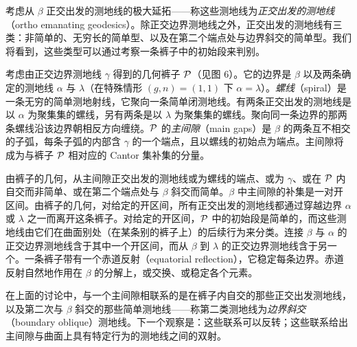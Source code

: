 
考虑从 $\beta$ 正交出发的测地线的极大延拓——称这些测地线为\emph{正交出发的测地线}（ortho emanating geodesics）。除正交边界测地线之外，正交出发的测地线有三类：非简单的、无穷长的简单型、以及在第二个端点处与边界斜交的简单型。我们将看到，这些类型可以通过考察一条裤子中的初始段来判别。

考虑由正交边界测地线 $\gamma$ 得到的几何裤子 $\mathcal{P}$（见图 6）。它的边界是 $\beta$ 以及两条确定的测地线 $\alpha$ 与 $\lambda$（在特殊情形 $(g,n)=(1,1)$ 下 $\alpha=\lambda$）。\emph{螺线}（spiral）是一条无穷的简单测地射线，它聚向一条简单闭测地线。有两条正交出发的测地线是以 $\alpha$ 为聚集集的螺线，另有两条是以 $\lambda$ 为聚集集的螺线。聚向同一条边界的那两条螺线沿该边界朝相反方向缠绕。$\mathcal{P}$ 的\emph{主间隙}（main gaps）是 $\beta$ 的两条互不相交的子弧，每条子弧的内部含 $\gamma$ 的一个端点，且以螺线的初始点为端点。主间隙将成为与裤子 $\mathcal{P}$ 相对应的 Cantor 集补集的分量。

由裤子的几何，从主间隙正交出发的测地线或为螺线的端点、或为 $\gamma$、或在 $\mathcal{P}$ 内自交而非简单、或在第二个端点处与 $\beta$ 斜交而简单。$\beta$ 中主间隙的补集是一对开区间。由裤子的几何，对给定的开区间，所有正交出发的测地线都通过穿越边界 $\alpha$ 或 $\lambda$ 之一而离开这条裤子。对给定的开区间，$\mathcal{P}$ 中的初始段是简单的，而这些测地线由它们在曲面别处（在某条别的裤子上）的后续行为来分类。连接 $\beta$ 与 $\alpha$ 的正交边界测地线含于其中一个开区间，而从 $\beta$ 到 $\lambda$ 的正交边界测地线含于另一个。一条裤子带有一个赤道反射（equatorial reflection），它稳定每条边界。赤道反射自然地作用在 $\beta$ 的分解上，或交换、或稳定各个元素。


在上面的讨论中，与一个主间隙相联系的是在裤子内自交的那些正交出发测地线，以及第二次与 $\beta$ 斜交的那些简单测地线——称第二类测地线为\emph{边界斜交}（boundary oblique）测地线。下一个观察是：这些联系可以反转；这些联系给出主间隙与曲面上具有特定行为的测地线之间的双射。

